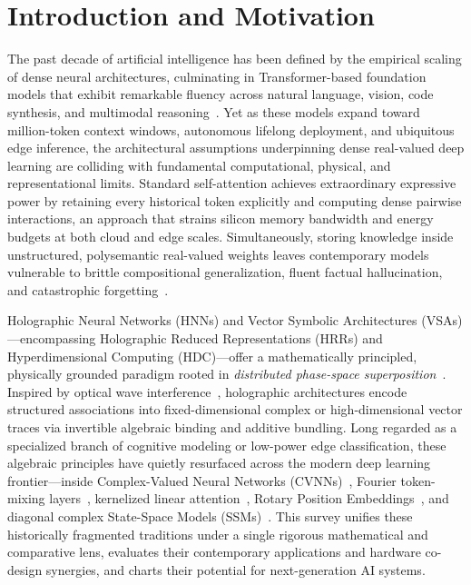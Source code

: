 \section{Introduction and Motivation}\label{sec:intro}

The past decade of artificial intelligence has been defined by the empirical scaling of dense neural architectures, culminating in Transformer-based foundation models that exhibit remarkable fluency across natural language, vision, code synthesis, and multimodal reasoning~\cite{VASWANI_TRANSFORMER}.
Yet as these models expand toward million-token context windows, autonomous lifelong deployment, and ubiquitous edge inference, the architectural assumptions underpinning dense real-valued deep learning are colliding with fundamental computational, physical, and representational limits.
Standard self-attention achieves extraordinary expressive power by retaining every historical token explicitly and computing dense pairwise interactions, an approach that strains silicon memory bandwidth and energy budgets at both cloud and edge scales.
Simultaneously, storing knowledge inside unstructured, polysemantic real-valued weights leaves contemporary models vulnerable to brittle compositional generalization, fluent factual hallucination, and catastrophic forgetting~\cite{ELHAGE_2022_SUPERPOSITION,KIRKPATRICK_2017_EWC}.

Holographic Neural Networks (HNNs) and Vector Symbolic Architectures (VSAs)---encompassing Holographic Reduced Representations (HRRs) and Hyperdimensional Computing (HDC)---offer a mathematically principled, physically grounded paradigm rooted in \emph{distributed phase-space superposition}~\cite{SUTHERLAND_1990_HNN,PLATE_1995_HRR,KANERVA_2009_HDC}.
Inspired by optical wave interference~\cite{GABOR_1948_HOLOGRAPHY}, holographic architectures encode structured associations into fixed-dimensional complex or high-dimensional vector traces via invertible algebraic binding and additive bundling.
Long regarded as a specialized branch of cognitive modeling or low-power edge classification, these algebraic principles have quietly resurfaced across the modern deep learning frontier---inside Complex-Valued Neural Networks (CVNNs)~\cite{BASSEY_CVNN_SURVEY,TRABELSI_2018_DCN}, Fourier token-mixing layers~\cite{LEE_THORP_FNET}, kernelized linear attention~\cite{KATHAROPOULOS_2020_LINEAR_TRANSFORMER}, Rotary Position Embeddings~\cite{SU_2024_ROPE}, and diagonal complex State-Space Models (SSMs)~\cite{GU_SSM_S4_MAMBA}.
This survey unifies these historically fragmented traditions under a single rigorous mathematical and comparative lens, evaluates their contemporary applications and hardware co-design synergies, and charts their potential for next-generation AI systems.

